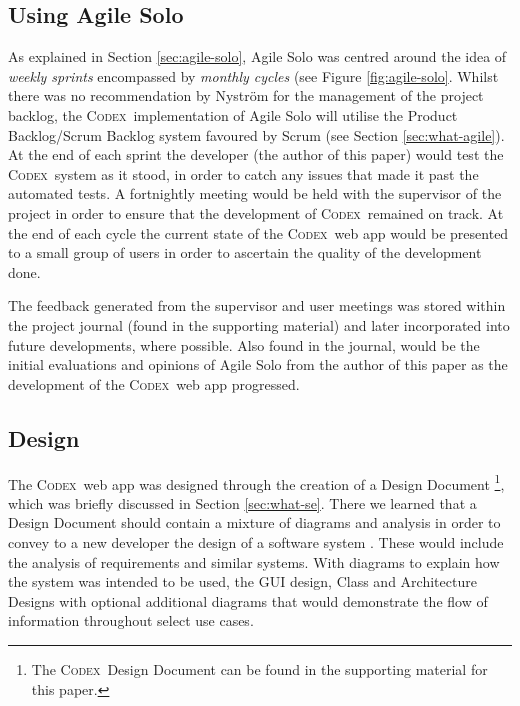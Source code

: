 \documentclass[final]{cmpreport}
\newcommand{\Codex}{\textsc{Codex}}
\begin{document}
		\subsection{Using Agile Solo} \label{sec:use-agile-solo}
		As explained in Section \ref{sec:agile-solo}, Agile Solo was centred around the idea of \textit{weekly sprints} encompassed by \textit{monthly cycles} (see Figure \ref{fig:agile-solo}. Whilst there was no recommendation by Nystr{\"o}m for the management of the project backlog, the \Codex \ implementation of Agile Solo will utilise the Product Backlog/Scrum Backlog system favoured by Scrum (see Section \ref{sec:what-agile}). At the end of each sprint the developer (the author of this paper) would test the \Codex \ system as it stood, in order to catch any issues that made it past the automated tests. A fortnightly meeting would be held with the supervisor of the project in order to ensure that the development of \Codex \ remained on track. At the end of each cycle the current state of the \Codex \ web app would be presented to a small group of users in order to ascertain the quality of the development done.
		
		The feedback generated from the supervisor and user meetings was stored within the project journal (found in the supporting material) and later incorporated into future developments, where possible. Also found in the journal, would be the initial evaluations and opinions of Agile Solo from the author of this paper as the development of the \Codex \ web app progressed. 
		
		\subsection{Design} \label{sec:design}
		The \Codex \ web app was designed through the creation of a Design Document \footnote{The \Codex \ Design Document can be found in the supporting material for this paper.}, which was briefly discussed in Section \ref{sec:what-se}. There we learned that a Design Document should contain a mixture of diagrams and analysis in order to convey to a new developer the design of a software system \citep{DesignDocExample}. These would include the analysis of requirements and similar systems. With diagrams to explain how the system was intended to be used, the GUI design, Class and Architecture Designs with optional additional diagrams that would demonstrate the flow of information throughout select use cases.
		
\end{document}
